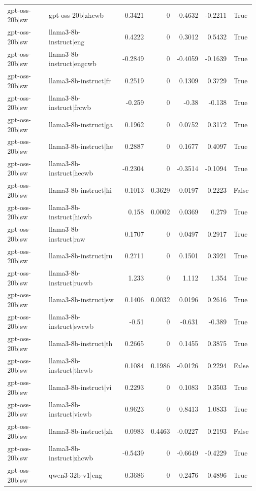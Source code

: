 \begin{table}
\begin{tabular}{l l r r r r l}
gpt-oss-20b|sw & gpt-oss-20b|zhcwb & -0.3421 & 0 & -0.4632 & -0.2211 & True \\
gpt-oss-20b|sw & llama3-8b-instruct|eng & 0.4222 & 0 & 0.3012 & 0.5432 & True \\
gpt-oss-20b|sw & llama3-8b-instruct|engcwb & -0.2849 & 0 & -0.4059 & -0.1639 & True \\
gpt-oss-20b|sw & llama3-8b-instruct|fr & 0.2519 & 0 & 0.1309 & 0.3729 & True \\
gpt-oss-20b|sw & llama3-8b-instruct|frcwb & -0.259 & 0 & -0.38 & -0.138 & True \\
gpt-oss-20b|sw & llama3-8b-instruct|ga & 0.1962 & 0 & 0.0752 & 0.3172 & True \\
gpt-oss-20b|sw & llama3-8b-instruct|he & 0.2887 & 0 & 0.1677 & 0.4097 & True \\
gpt-oss-20b|sw & llama3-8b-instruct|hecwb & -0.2304 & 0 & -0.3514 & -0.1094 & True \\
gpt-oss-20b|sw & llama3-8b-instruct|hi & 0.1013 & 0.3629 & -0.0197 & 0.2223 & False \\
gpt-oss-20b|sw & llama3-8b-instruct|hicwb & 0.158 & 0.0002 & 0.0369 & 0.279 & True \\
gpt-oss-20b|sw & llama3-8b-instruct|raw & 0.1707 & 0 & 0.0497 & 0.2917 & True \\
gpt-oss-20b|sw & llama3-8b-instruct|ru & 0.2711 & 0 & 0.1501 & 0.3921 & True \\
gpt-oss-20b|sw & llama3-8b-instruct|rucwb & 1.233 & 0 & 1.112 & 1.354 & True \\
gpt-oss-20b|sw & llama3-8b-instruct|sw & 0.1406 & 0.0032 & 0.0196 & 0.2616 & True \\
gpt-oss-20b|sw & llama3-8b-instruct|swcwb & -0.51 & 0 & -0.631 & -0.389 & True \\
gpt-oss-20b|sw & llama3-8b-instruct|th & 0.2665 & 0 & 0.1455 & 0.3875 & True \\
gpt-oss-20b|sw & llama3-8b-instruct|thcwb & 0.1084 & 0.1986 & -0.0126 & 0.2294 & False \\
gpt-oss-20b|sw & llama3-8b-instruct|vi & 0.2293 & 0 & 0.1083 & 0.3503 & True \\
gpt-oss-20b|sw & llama3-8b-instruct|vicwb & 0.9623 & 0 & 0.8413 & 1.0833 & True \\
gpt-oss-20b|sw & llama3-8b-instruct|zh & 0.0983 & 0.4463 & -0.0227 & 0.2193 & False \\
gpt-oss-20b|sw & llama3-8b-instruct|zhcwb & -0.5439 & 0 & -0.6649 & -0.4229 & True \\
gpt-oss-20b|sw & qwen3-32b-v1|eng & 0.3686 & 0 & 0.2476 & 0.4896 & True \\

\end{tabular}
\end{table}
